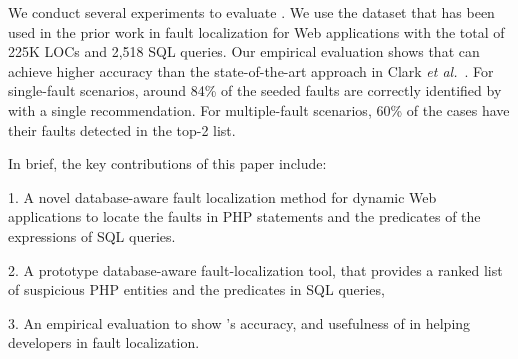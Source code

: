 We conduct several experiments to evaluate {\tool}. We use the dataset
that has been used in the prior work in fault localization for Web
applications with the total of 225K LOCs and 2,518 SQL queries.  Our
empirical evaluation shows that {\tool} can achieve higher accuracy
than the state-of-the-art approach in Clark {\em et
  al.}~\cite{ga-ase11}. For single-fault scenarios, around 84\% of the
seeded faults are correctly identified by {\tool} with a single
recommendation. For multiple-fault scenarios, 60\% of the cases have
their faults detected in the top-2 list.


In brief, the key contributions of this paper include:

1. A novel database-aware fault localization method for dynamic
Web applications to locate the faults in PHP statements and the
predicates of the  expressions of SQL queries.

2. A prototype database-aware fault-localization tool, {\tool} that
provides a ranked list of suspicious PHP entities and the predicates
in SQL queries,

3. An empirical evaluation to show {\tool}'s accuracy, and usefulness
of {\tool} in helping developers in fault localization.



